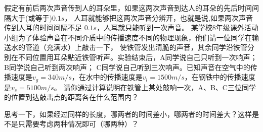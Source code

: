 \documentclass[windows,csize4]{BHCexam}
\begin{document}
\begin{groups}
\begin{questions}[]
        \question[5] 假定有前后两次声音传到人的耳朵里，如果这两次声音到达人的耳朵的先后时间间隔大于(或等于)$0.1s$，
        人耳就能够把这两次声音分辨开，也就是说,如果两次声音传到人耳的时间间隔不足 $0.1 s$，人耳就只能听到一次声音。
        某学校8年级课外活动小组为了体验声音在不同介质中的传播速度不同的物理现象，他们请一位同学在输送水的管道（充满水）上敲击一下，
        使铁管发出清脆的声音，其余同学沿铁管分别在不同位置用耳朵贴近铁管听声。实验结束后，A同学说自己只听到一次响声；B同学说自己听到两次响声；
        C同学说自己听到三次响声。已知声音在空气中的传播速度是$v_g=340 m/s$，在水中的传播速度是$v_l=1500 m/s$，在钢铁中的传播速度是$v_s=5100m/s$。
        请你通过计算说明在铁管上某处敲响一次，A、B、C三位同学的位置到达敲击点的距离各在什么范围内？
        \begin{solution}{0.5cm}
            \methodonly 思考一下，如果经过同样的长度，哪两者的时间差小，哪两者的时间差大？这样是不是只需要考虑两种情况即可（哪两种）？
        \end{solution}



    \end{questions}
















\end{groups}




\label{lastpage}
\end{document}
